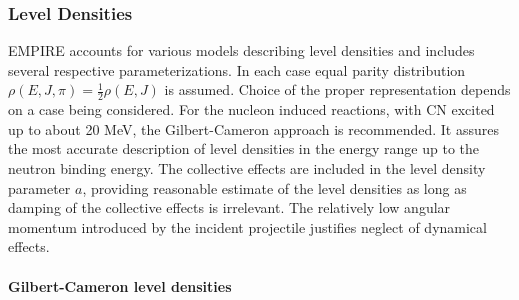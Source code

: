 %
%
%

\subsubsection{Level Densities}

EMPIRE accounts for various models describing level densities%
 and includes several respective parameterizations. In
each case equal parity distribution $\rho(E,J,\pi)=%
\frac{1}{2}\rho(E,J)$ is assumed. Choice of the proper representation
depends on a case being considered. For the nucleon induced reactions, with
CN excited up to about 20 MeV, the Gilbert-Cameron approach is recommended.
It assures the most accurate description of level densities in the energy
range up to the neutron binding energy. The collective effects are included
in the level density parameter $a$, providing reasonable estimate of the
level densities as long as damping of the collective effects is irrelevant.
The relatively low angular momentum introduced by the incident projectile
justifies neglect of dynamical effects.

\medskip

\paragraph{Gilbert-Cameron level densities}


